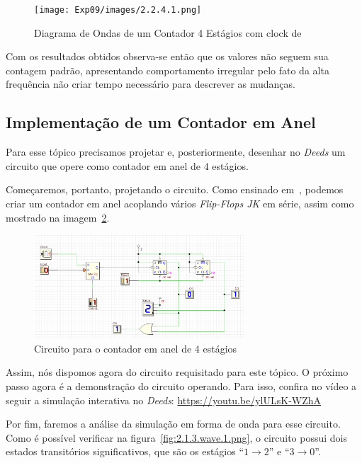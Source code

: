 \documentclass[12pt]{article}
\begin{document}
\begin{figure}[H]
  \centering
  \texttt{[image: Exp09/images/2.2.4.1.png]}
  \caption{Diagrama de Ondas de um Contador 4 Estágios com clock de }\label{2.2.4.1.png}
\end{figure}

Com os resultados obtidos observa-se então que os valores não seguem sua contagem padrão, apresentando comportamento irregular pelo fato da alta frequência não criar tempo necessário para descrever as mudanças.

\subsection{Implementação de um Contador em Anel}\label{sec:2.3}

Para esse tópico precisamos projetar e, posteriormente, desenhar no \emph{Deeds}
um circuito que opere como contador em anel de $4$ estágios.

Começaremos, portanto, projetando o circuito. Como ensinado
em~\cite{circuito_anel_CL}, podemos criar um contador em anel acoplando vários
\emph{Flip-Flops JK} em série, assim como mostrado na
imagem~\ref{fig:2.1.3_circuit.png}.

\begin{figure}[H]
  \centering
  \includegraphics[width=0.7\textwidth]{Exp09/images/2.1.3_circuit.png}
  \caption{Circuito para o contador em anel de 4 estágios}\label{fig:2.1.3_circuit.png}
\end{figure}

Assim, nós dispomos agora do circuito requisitado para este tópico. O próximo
passo agora é a demonstração do circuito operando. Para isso, confira no vídeo a
seguir a simulação interativa no \emph{Deeds}:
\href{https://youtu.be/ylULsK-WZhA}{https://youtu.be/ylULsK-WZhA}

Por fim, faremos a análise da simulação em forma de onda para esse circuito.
Como é possível verificar na figura~\ref{fig:2.1.3.wave.1.png}, o circuito
possui dois estados transitórios significativos, que são os estágios
``$1 \rightarrow 2$'' e ``$3 \rightarrow 0$''.
\end{document}
